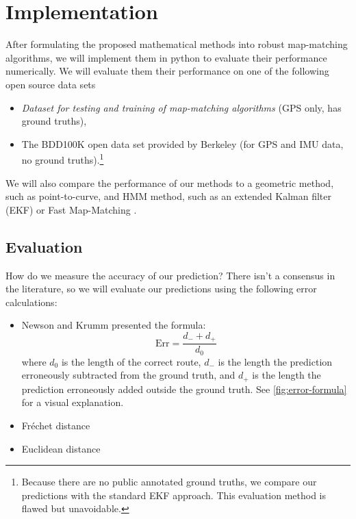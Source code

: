 \documentclass{article}
\numberwithin{equation}{section}
\theoremstyle{definition}
\begin{document}


\section{Implementation}

After formulating the proposed  mathematical methods into robust map-matching algorithms, we will implement them in python to evaluate their performance numerically. We will evaluate them their performance on one of the following open source data sets
\begin{itemize}
    \item \textit{Dataset for testing and training of map-matching algorithms} \cite{KCMMN} (GPS only, has ground truths),
    \item The BDD100K open data set provided by Berkeley \cite{yuBDD100KDiverseDriving2020} (for GPS and IMU data, no ground truths).\footnote{Because there are no public annotated ground truths, we compare our predictions with the standard EKF approach. This evaluation method is flawed but unavoidable.} %
\end{itemize}
We will also compare the performance of our methods to a geometric method, such as point-to-curve, and HMM method, such as an extended Kalman filter (EKF) or Fast Map-Matching \cite{YG}.

\subsection{Evaluation} \label{Eval}
\label{sub:evaluation}

How do we measure the accuracy of our prediction? There isn't a consensus in the literature, so we will evaluate our predictions using the following error calculations:
\begin{itemize}
    \item Newson and Krumm presented the formula: $$\textrm{Err} = \frac{d_- + d_+}{d_0}$$ where $d_0$ is the length of the correct route, $d_-$ is the length the prediction erroneously subtracted from the ground truth, and $d_+$ is the length the prediction erroneously added outside the ground truth. See \autoref{fig:error-formula} \cite{newsonHiddenMarkovMap2009} for a visual explanation.
    \item Fréchet distance
    \item Euclidean distance
\end{itemize}
\end{document}
